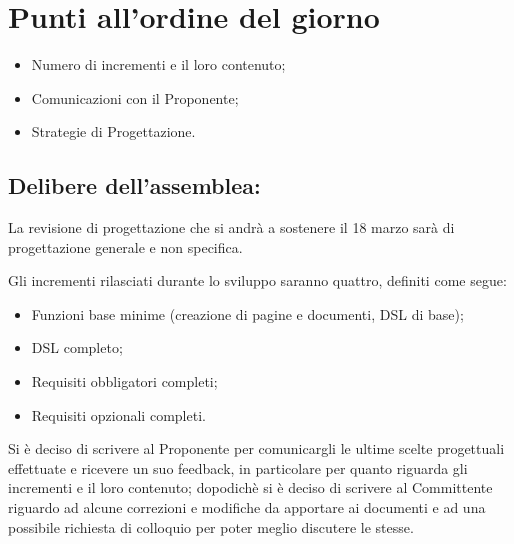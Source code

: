 \newpage
\section{Punti all'ordine del giorno}
\label{2}

\begin{itemize}
\item Numero di incrementi e il loro contenuto;
\item Comunicazioni con il Proponente;
\item Strategie di Progettazione.
\end{itemize}


\subsection{Delibere dell’assemblea:}
La revisione di progettazione che si andrà a sostenere il 18 marzo sarà di progettazione generale e non specifica.

Gli incrementi rilasciati durante lo sviluppo saranno quattro, definiti come segue:

\begin{itemize}
\item Funzioni base minime (creazione di pagine e documenti, DSL di base);
\item DSL completo;
\item Requisiti obbligatori completi;
\item Requisiti opzionali completi.
\end{itemize}

Si è deciso di scrivere al Proponente per comunicargli  le ultime scelte progettuali effettuate e ricevere un suo feedback, in particolare per quanto riguarda gli incrementi e il loro contenuto; dopodichè si è deciso di scrivere al Committente riguardo ad alcune correzioni e modifiche da apportare ai documenti e ad una possibile richiesta di colloquio per poter meglio discutere le stesse.



